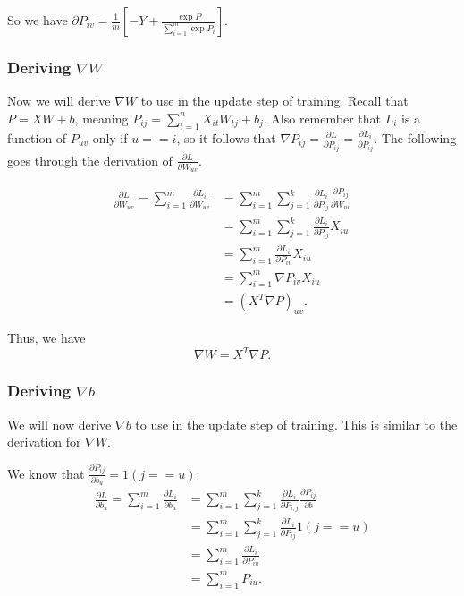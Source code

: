 So we have $\partial P_{iv} = \frac{1}{m} \left[ -Y +
\frac{\exp{P}}{\sum_{i=1}^m \exp{P_i}} \right]$.

\subsubsection{Deriving $\nabla W$}
Now we will derive $\nabla W$ to use in the update step of training. Recall
that $P = XW + b$, meaning $P_{ij} = \sum_{t=1}^n X_{it}W_{tj} + b_j $.
Also remember that $L_i$ is a function of $P_{uv}$ only if $u == i$, so it
follows that $\nabla P_{ij} = \frac{\partial L}{\partial P_{ij}} =
\frac{\partial L_i}{\partial P_{ij}}$. The following goes through the
derivation of $\frac{\partial L}{\partial W_{uv}}$.

\begin{align*} 
     \frac{\partial L}{\partial W_{uv}} = 
     \sum_{i=1}^m \frac{\partial L_i}{\partial W_{uv}} &= 
     \sum_{i=1}^m \sum_{j=1}^k \frac{\partial L_i}{\partial P_{ij}}
       \frac{\partial P_{ij}}{\partial W_{uv}}\\
     &= \sum_{i=1}^m \sum_{j=1}^k
         \frac{\partial L_i}{\partial P_{ij}} X_{iu}\\
     &= \sum_{i=1}^m \frac{\partial L_i}{\partial P_{iv}} X_{iu}\\
     &= \sum_{i=1}^m \nabla P_{iv} X_{iu}\\
     &= \left( X^T \nabla P \right)_{uv}.
\end{align*}

Thus, we have
$$ \nabla W = X^T \nabla P. $$

\subsubsection{Deriving $\nabla b$}
We will now derive $\nabla b$ to use in the update step of training. This is
similar to the derivation for $\nabla W$.

We know that $\frac{\partial P_{ij}}{\partial b_u} = 1(j == u).$
\begin{align*} 
  \frac{\partial L}{\partial b_u} = 
  \sum_{i=1}^m \frac{\partial L_i}{\partial b_u} &= 
  \sum_{i=1}^m \sum_{j=1}^k \frac{\partial L_i}{\partial P_{i, j}}
  \frac{\partial P_{ij}}{\partial b}\\
  &= \sum_{i=1}^m \sum_{j=1}^k \frac{\partial L_i}{\partial P_{ij}} 1(j == u)\\
  &= \sum_{i=1}^m \frac{\partial L_i}{\partial P_{iu}} \\
  &= \sum_{i=1}^m P_{iu}.
\end{align*}

